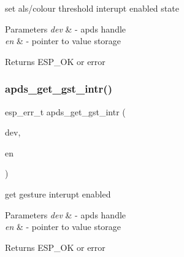 \begin{DoxyItemize}
\item set als/colour threshold interupt enabled state 
\end{DoxyItemize}


\begin{DoxyParams}{Parameters}
{\em dev} & -\/ apds handle \\
\hline
{\em en} & -\/ pointer to value storage \\
\hline
\end{DoxyParams}
\begin{DoxyReturn}{Returns}
E\+S\+P\+\_\+\+OK or error 
\end{DoxyReturn}
\mbox{\label{group__APDS9960__InterruptFunctions_ga9916d8429e0e551e80b87d24f76af03a}} 
\subsubsection{\texorpdfstring{apds\+\_\+get\+\_\+gst\+\_\+intr()}{apds\_get\_gst\_intr()}}
{\footnotesize\ttfamily esp\+\_\+err\+\_\+t apds\+\_\+get\+\_\+gst\+\_\+intr (\begin{DoxyParamCaption}\item[{\hyperlink{structAPDS9960__Driver}{A\+P\+D\+S\+\_\+\+D\+EV}}]{dev,  }\item[{\hyperlink{vl53l0x__types_8h_aba7bc1797add20fe3efdf37ced1182c5}{uint8\+\_\+t} $\ast$}]{en }\end{DoxyParamCaption})}




\begin{DoxyItemize}
\item get gesture interupt enabled 
\end{DoxyItemize}


\begin{DoxyParams}{Parameters}
{\em dev} & -\/ apds handle \\
\hline
{\em en} & -\/ pointer to value storage \\
\hline
\end{DoxyParams}
\begin{DoxyReturn}{Returns}
E\+S\+P\+\_\+\+OK or error 
\end{DoxyReturn}
\mbox{\label{group__APDS9960__InterruptFunctions_ga6292cc16a94b497ba44c65bd75b8fe7d}} 

